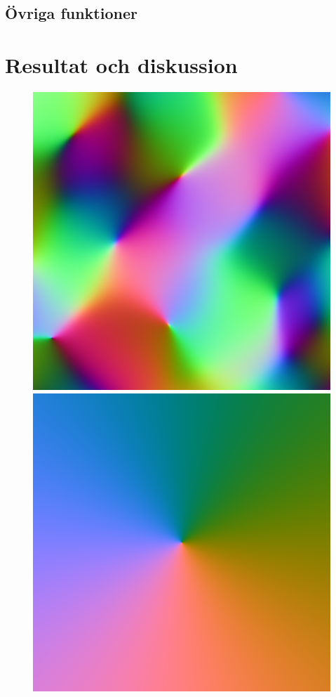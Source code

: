 \documentclass[a4paper]{article}
\begin{document}
        \subsection{Övriga funktioner}

    \section{Resultat och diskussion}

\begin{figure}[H]
\center
\begin{minipage}[]{0.19\textwidth}
\includegraphics[width=\textwidth]{share/Noise.png}
\end{minipage}
\begin{minipage}[]{0.19\textwidth}
\includegraphics[width=\textwidth]{share/Background.png}

\end{minipage}
\end{figure}
\end{document}
